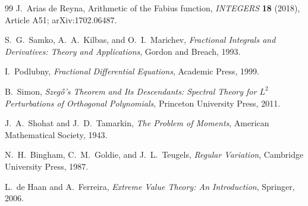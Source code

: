 \documentclass[11pt,oneside]{article}
\numberwithin{equation}{section}
\theoremstyle{definition}
\theoremstyle{remark}
\begin{document}
\begin{thebibliography}{99}
J.~Arias de Reyna,
\newblock Arithmetic of the Fabius function,
\newblock \emph{INTEGERS} \textbf{18} (2018), Article A51; arXiv:1702.06487.

S.~G.~Samko, A.~A.~Kilbas, and O.~I.~Marichev,
\newblock \emph{Fractional Integrals and Derivatives: Theory and Applications},
\newblock Gordon and Breach, 1993.

I.~Podlubny,
\newblock \emph{Fractional Differential Equations},
\newblock Academic Press, 1999.

B.~Simon,
\newblock \emph{Szeg\H{o}'s Theorem and Its Descendants: Spectral Theory for $L^2$ Perturbations of Orthogonal Polynomials},
\newblock Princeton University Press, 2011.

J.~A.~Shohat and J.~D.~Tamarkin,
\newblock \emph{The Problem of Moments},
\newblock American Mathematical Society, 1943.

N.~H.~Bingham, C.~M.~Goldie, and J.~L.~Teugels,
\newblock \emph{Regular Variation},
\newblock Cambridge University Press, 1987.

L.~de Haan and A.~Ferreira,
\newblock \emph{Extreme Value Theory: An Introduction},
\newblock Springer, 2006.

\end{thebibliography}
\end{document}
